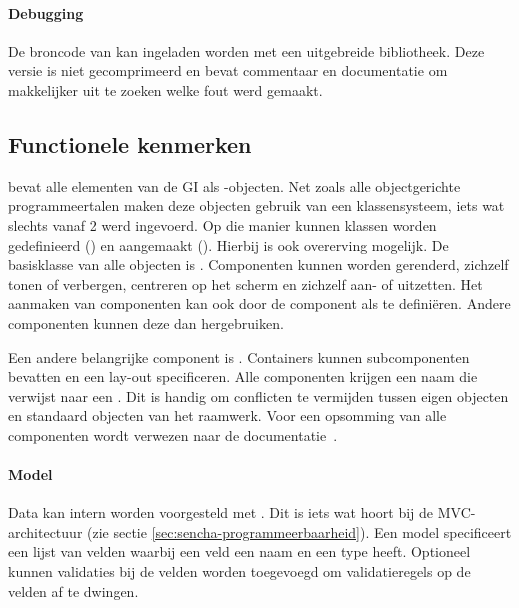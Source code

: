 
\paragraph{Debugging}
De broncode van \st{} kan ingeladen worden met een uitgebreide bibliotheek.  
Deze versie is niet gecomprimeerd en bevat commentaar en documentatie om makkelijker uit te zoeken welke fout werd gemaakt.

\subsection{Functionele kenmerken}
\st{} bevat alle elementen van de GI als \js{}-objecten.  
Net zoals alle objectgerichte programmeertalen maken deze objecten gebruik van een klassensysteem,  iets wat slechts vanaf \st{} 2 werd ingevoerd.  
Op die manier kunnen klassen worden gedefinieerd () en aangemaakt ().  
Hierbij is ook overerving mogelijk.  
De basisklasse van alle objecten is .  
Componenten kunnen worden gerenderd, zichzelf tonen of verbergen,  centreren op het scherm en zichzelf aan- of uitzetten.   
Het aanmaken van componenten kan ook door de component als  te definiëren.  
Andere componenten kunnen deze  dan hergebruiken.

Een andere belangrijke component is .  
Containers kunnen subcomponenten bevatten en een lay-out specificeren.  
Alle componenten krijgen een naam die verwijst naar een .  
Dit is handig om conflicten te vermijden tussen eigen objecten en standaard objecten van het raamwerk.  
Voor een opsomming van alle componenten wordt verwezen naar de documentatie~\cite{Inc.2013a}.

\paragraph{Model}
Data kan intern worden voorgesteld met .  
Dit is iets wat hoort bij de MVC-architectuur (zie sectie \ref{sec:sencha-programmeerbaarheid}).  
Een model specificeert een lijst van velden waarbij een veld een naam en een type heeft.  
Optioneel kunnen validaties bij de velden worden toegevoegd om validatieregels op de velden af te dwingen.  

